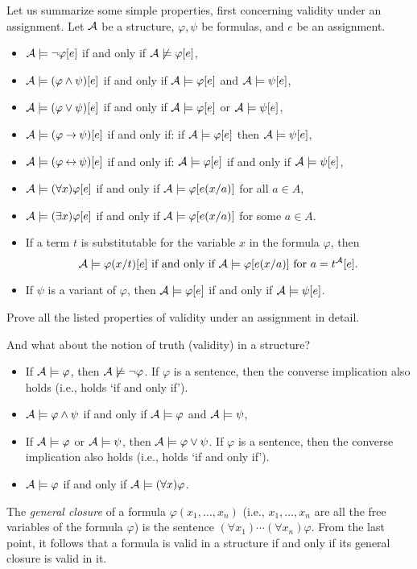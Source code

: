 Let us summarize some simple properties, first concerning validity under an assignment. Let $\mathcal{A}$ be a structure, $\varphi,\psi$ be formulas, and $e$ be an assignment.
\begin{itemize}
    \item $\mathcal{A}\models\neg\varphi[e]$ if and only if $\mathcal{A}\not\models\varphi[e]$,
    \item $\mathcal{A}\models(\varphi\land\psi)[e]$ if and only if $\mathcal{A}\models\varphi[e]$ and $\mathcal{A}\models\psi[e]$,
    \item $\mathcal{A}\models(\varphi\lor\psi)[e]$ if and only if $\mathcal{A}\models\varphi[e]$ or $\mathcal{A}\models\psi[e]$,
    \item $\mathcal{A}\models(\varphi\mathbin{\rightarrow}\psi)[e]$ if and only if: if $\mathcal{A}\models\varphi[e]$ then $\mathcal{A}\models\psi[e]$,
    \item $\mathcal{A}\models(\varphi\mathbin{\leftrightarrow}\psi)[e]$ if and only if: $\mathcal{A}\models\varphi[e]$ if and only if $\mathcal{A}\models\psi[e]$,
    \item $\mathcal{A}\models(\forall x)\varphi[e]$ if and only if $\mathcal{A}\models\varphi[e(x/a)]$ for all $a\in A$,
    \item $\mathcal{A}\models(\exists x)\varphi[e]$ if and only if $\mathcal{A}\models\varphi[e(x/a)]$ for some $a\in A$.
    \item If a term $t$ is substitutable for the variable $x$ in the formula $\varphi$, then
    $$
    \mathcal{A}\models\varphi(x/t)[e]\text{ if and only if }\mathcal{A}\models\varphi[e(x/a)]\text{ for }a=t^{\mathcal{A}}[e].
    $$
    \item If $\psi$ is a variant of $\varphi$, then $\mathcal{A}\models\varphi[e]$ if and only if $\mathcal{A}\models\psi[e]$.
\end{itemize}

\begin{exercise}
    Prove all the listed properties of validity under an assignment in detail.
\end{exercise}

And what about the notion of truth (validity) in a structure?
\begin{itemize}
    \item If $\mathcal{A}\models\varphi$, then $\mathcal{A}\not\models\neg\varphi$. If $\varphi$ is a sentence, then the converse implication also holds (i.e., holds `if and only if').
    \item $\mathcal{A}\models\varphi\land\psi$ if and only if $\mathcal{A}\models\varphi$ and $\mathcal{A}\models\psi$,
    \item If $\mathcal{A}\models\varphi$ or $\mathcal{A}\models\psi$, then $\mathcal{A}\models\varphi\lor\psi$. If $\varphi$ is a sentence, then the converse implication also holds (i.e., holds `if and only if').
    \item $\mathcal{A}\models\varphi$ if and only if $\mathcal{A}\models
    (\forall x)\varphi$.
\end{itemize}
The \emph{general closure} of a formula $\varphi(x_1,\dots,x_n)$ (i.e., $x_1,\dots,x_n$ are all the free variables of the formula $\varphi$) is the sentence $(\forall x_1)\cdots(\forall x_n)\varphi$. From the last point, it follows that a formula is valid in a structure if and only if its general closure is valid in it.

